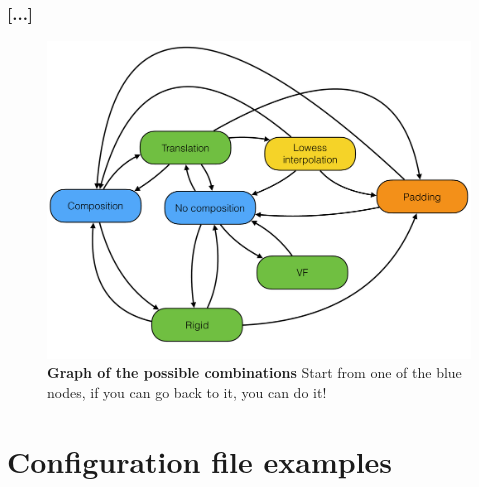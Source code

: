 \documentclass[10pt,a4paper]{article}
\begin{document}
\subsubsection{[...]}
\begin{figure}
  \centering
    \includegraphics[width=.85\textwidth]{figures/possibilities.pdf}
  \caption{\textbf{Graph of the possible combinations} Start from one of the blue nodes, if you can go back to it, you can do it!}\label{fig:poss}
\end{figure}
\section{Configuration file examples}
\end{document}
